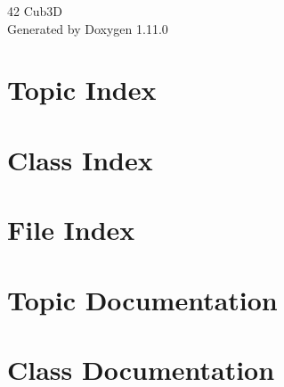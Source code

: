 \documentclass[twoside]{book}
\newcommand{\+}{\discretionary{\mbox{\scriptsize$\hookleftarrow$}}{}{}}
\newcommand{\clearemptydoublepage}{%
    \newpage{\pagestyle{empty}\cleardoublepage}%
  }
\begin{document}
  \raggedbottom
    \hypersetup{pageanchor=false,
                bookmarksnumbered=true,
                pdfencoding=unicode
               }
  \begin{titlepage}
  \vspace*{7cm}
  \begin{center}%
  {\Large 42 Cub3D}\\
  \vspace*{1cm}
  {\large Generated by Doxygen 1.11.0}\\
  \end{center}
  \end{titlepage}
  \clearemptydoublepage
  \tableofcontents
  \clearemptydoublepage
  \hypersetup{pageanchor=true}




\chapter{Topic Index}

\chapter{Class Index}

\chapter{File Index}

\chapter{Topic Documentation}



\chapter{Class Documentation}
















\end{document}
